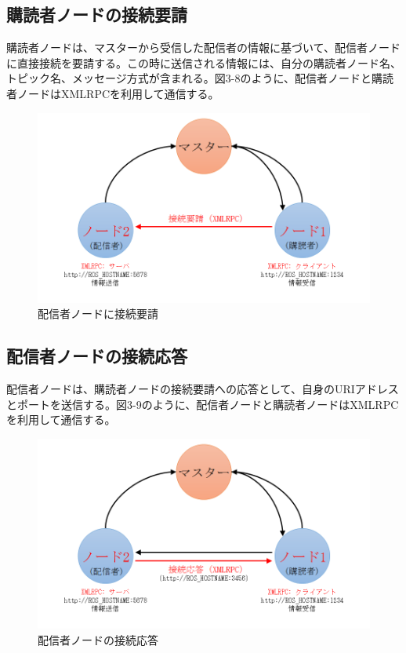 \subsection{購読者ノードの接続要請}
購読者ノードは、マスターから受信した配信者の情報に基づいて、配信者ノードに直接接続を要請する。この時に送信される情報には、自分の購読者ノード名、トピック名、メッセージ方式が含まれる。図3-8のように、配信者ノードと購読者ノードはXMLRPCを利用して通信する。

\begin{figure}[h]
  \centering
  \includegraphics[width=\columnwidth]{pictures/chapter3/pic_03_08.png}
  \caption{配信者ノードに接続要請}
\end{figure}

\subsection{配信者ノードの接続応答}
配信者ノードは、購読者ノードの接続要請への応答として、自身のURIアドレスとポートを送信する。図3-9のように、配信者ノードと購読者ノードはXMLRPCを利用して通信する。

\begin{figure}[h]
  \centering
  \includegraphics[width=\columnwidth]{pictures/chapter3/pic_03_09.png}
  \caption{配信者ノードの接続応答}
\end{figure}

